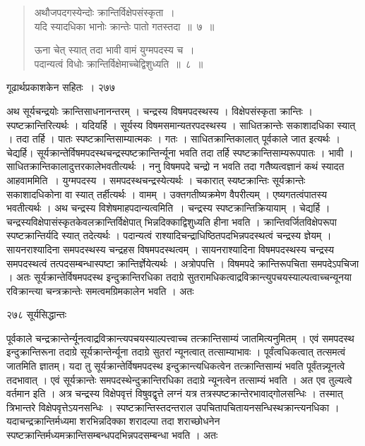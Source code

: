 \documentclass[11pt, openany]{book}
\begin{document}
\begin{quote}
{\ssi अथौजपदगस्येन्दोः क्रान्तिर्विक्षेपसंस्कृता~।\\
 यदि स्यादधिका भानोः क्रान्तेः पातो गतस्तदा~॥~७~॥

ऊना चेत् स्यात् तदा भावी वामं युग्मपदस्य च~।\\
पदान्यत्वं विधोः क्रान्तिर्विक्षेमाच्चेद्विशुध्यति~॥~८~॥}
\end{quote}


\newpage


\hspace{3cm} गूढार्थप्रकाशकेन सहितः~। \hfill २७७
\vspace{1cm}


 अथ सूर्यचन्द्रयोः क्रान्तिसाधनानन्तरम् । चन्द्रस्य विषमपदस्थस्य । विक्षेपसंस्कृता क्रान्तिः । स्पष्टक्रान्तिरित्यर्थः । यदियर्हि । सूर्यस्य विषमसमान्यतरपदस्थस्य । साधितक्रान्तेः सकाशादधिका स्यात् । तदा तर्हि । पातः स्पष्टक्रान्तिसाम्यात्मकः । गतः । साधितक्रान्तिकालात् पूर्वकाले जात इत्यर्थः । चेद्यर्हि। सूर्यक्रान्तेर्विषमपदस्थचन्द्रस्पष्टक्रान्तिर्न्यूना भवति तदा तर्हि स्पष्टक्रान्तिसाम्यरूपपातः । भावी । साधितक्रान्तिकालादुत्तरकालेभवतीत्यर्थः । ननु विषमपदे चन्द्रो न भवति तदा गतैष्यत्वज्ञानं कथं स्यादत आह\textendash वाममिति~। युग्मपदस्य । समपदस्थचन्द्रस्येत्यर्थः । चकारात् स्यष्टक्रान्तिः सूर्यक्रान्तेः सकाशादधिकोना वा स्यात् तर्हीत्यर्थः । वामम् । उक्तगतीष्यक्रमेण वैपरीत्यम् । एष्यगतत्वंपातस्य भवतीत्यर्थः । अथ चन्द्रस्य विशेषमाह\textendash पदान्यत्वमिति~। चन्द्रस्य स्पष्टक्रान्तिक्रियायाम् । चेद्यर्हि । चन्द्रस्यविक्षेपासंस्कृतकेवलक्रान्तिर्विक्षेपात् भिन्नदिक्काद्विशुध्यति हीना भवति । क्रान्तिवर्जितविक्षेपरूपा स्पष्टक्रान्तिर्यदि स्यात् तदेत्यर्थः । पदान्यत्वं राश्यादिचन्द्राधिष्ठितपदभिन्नपदस्थत्वं चन्द्रस्य ज्ञेयम् ।सायनराश्यादिना समपदस्थस्य चन्द्रहस विषमपदस्थत्वम् । सायनराश्यादिना विषमपदस्थस्य चन्द्रस्य समपदस्थत्वं तत्पदसम्बन्धास्पष्टा क्रान्तिर्ज्ञेयेत्यर्थः । अत्रोपपत्ति । विषमपदे क्रान्तिरूपचिता समपदेऽपचिजा । अतः सूर्यक्रान्तेर्विषमपदस्थ इन्दुक्रान्तिरधिका तदाग्रे सुतरामधिकत्वाद्रविक्रान्त्युपचयस्याल्पत्वाच्चन्यूनया रविक्रान्त्या चन्त्रक्रान्तेः समत्वमग्रिमकालेन भवति । अतः


\newpage


\noindent २७८ \hspace{4cm} सूर्यसिद्धान्तः
\vspace{1cm}


\noindent पूर्वकाले चन्द्रक्रान्तेर्न्यूनत्वाद्रविक्रान्त्यपचयस्याल्पत्त्वाच्च तत्क्रान्तिसाम्यं जातमित्यनुमितम् । एवं समपदस्थ इन्दुक्रान्तिरूना तदाग्रे सूर्यक्रान्तेर्न्यूना तदाग्रे सुतरां न्यूनत्वात् तत्साम्याभावः । पूर्वंत्वधिकत्वात् तत्समत्वं जातमिति ज्ञातम्। यदा तु सूर्यक्रान्तेर्विषमपदस्थ इन्दुक्रान्त्यधिकत्वेन तत्क्रान्तिसाम्यं भवति पूर्वंतन्न्यूनत्वे तदभावात् । एवं सूर्यक्रान्तेः समपदस्थेन्दुक्रान्तिरधिका तदाग्रे न्यूनत्वेन तत्साम्यं भवति । अत एव तुल्यत्वे वर्तमान इति । अत्र चन्द्रस्य विक्षेपवृत्तं विषुवद्वृत्ते लग्नं यत्र तत्रस्पष्टक्रान्तेरभावाद्गोलसन्धिः । तस्मात् त्रिभान्तरे विक्षेपवृत्तेऽयनसन्धिः । स्पष्टक्रान्तिस्तदन्तराल उपचितापचितायनसन्धिस्थक्रान्त्यनधिका । यदाचन्द्रक्रान्तिर्मध्यमा शरभिन्नदिक्का शरादल्पा तदा शराच्छोधनेन स्पष्टक्रान्तिर्मध्यमक्रान्तिसम्बन्धपदभिन्नपदसम्बन्धा भवति । अतः\textendash
\end{document}
